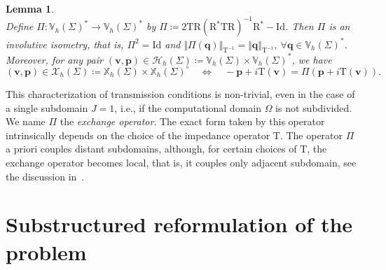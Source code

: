 \documentclass[a4paper,11pt]{article}
\newcommand{\Id}{\mathrm{Id}}
\newcommand{\mT}{\mathrm{T}}
\newcommand{\mR}{\mathrm{R}}
\newcommand{\mbV}{\mathbb{V}}
\newcommand{\mbX}{\mathbb{X}}
\newcommand{\bp}{\boldsymbol{p}}
\newcommand{\bv}{\boldsymbol{v}}
\newcommand{\bq}{\boldsymbol{q}}
\newtheorem{lem}[defn]{Lemma}
\begin{document}
\begin{lem}\label{CaracExchangeOp}\quad\\
  Define $\Pi\colon \mbV_h(\Sigma)^*\to \mbV_h(\Sigma)^*$ by $\Pi\coloneq 2\mT\mR
  (\mR^*\mT\mR)^{-1}\mR^*-\Id$. Then $\Pi$ is an involutive isometry, that is, 
  $\Pi^{2} = \Id$ and $\Vert \Pi(\bq)\Vert_{\mT^{-1}} = \Vert
  \bq\Vert_{\mT^{-1}}, \ \forall \bq\in \mbV_h(\Sigma)^*$. Moreover, for
  any pair $(\bv,\bp)\in \mathscr{H}_h(\Sigma) \coloneq \mbV_h(\Sigma)\times\mbV_h(\Sigma)^*$, we have
  \begin{equation}\label{CaracAvecEchangeOperator}
    (\bv,\bp)\in \mathscr{X}_h(\Sigma) \coloneq \mbX_h(\Sigma)\times\mbX_h(\Sigma)^{\circ}\quad
    \iff\quad -\bp+i\mT(\bv) = \Pi(\bp+i\mT(\bv)).
  \end{equation}
\end{lem}
\noindent 
This characterization of transmission conditions is non-trivial,
even in the case of a single subdomain $J = 1$, i.e., if the
computational domain $\Omega$ is not subdivided. We name $\Pi$ the
\textit{exchange operator}. The exact form taken by this operator
intrinsically depends on the choice of the impedance operator $\mT$. The
operator $\Pi$ a priori couples distant subdomains, although, for
certain choices of $\mT$, the exchange operator becomes local, that is, it couples only adjacent subdomain, see the
discussion in~\cite[Section 9]{MR4648528}.

\section{Substructured reformulation of the problem}\label{sec:problem_reformulation}
\end{document}
